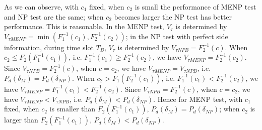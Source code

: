 As we can observe, with $c_1$  fixed, when $c_2$ is small the performance of MENP test and NP test are the same; when $c_2$ becomes larger the NP test has better performance. This is reasonable. In the MENP test, $V_\tau$ is determined by $V_{\tau MENP}= \min (F_1^{-1}(c_1), F_2^{-1}(c_2))$; in the NP test with perfect side information, during time slot $T_B$, $V_\tau$ is determined by $V_{\tau NP B} = F_2^{-1}(c)$. When $c_2 \leq F_2(F_1^{-1}(c_1))$, i.e. $F_1^{-1}(c_1) \geq  F_2^{-1}(c_2)$, we have  $V_{\tau MENP} = F_2^{-1}(c_2)$. Since $V_{\tau NP B} = F_2^{-1}(c)$, when $c = c_2$, we have $V_{\tau MENP} = V_{\tau NP B}$, i.e. $P_d(\delta_M) = P_d(\delta_{NP})$.    
When $c_2 > F_1(F_2^{-1}(c_1))$, i.e. $F_1^{-1}(c_1) < F_2^{-1}(c_2)$, we have  $V_{\tau MENP} = F_1^{-1}(c_1) < F_2^{-1}(c_2)$. Since $V_{\tau NP B} = F_2^{-1}(c)$, when $c = c_2$, we have  $V_{\tau MENP} < V_{\tau NP B}$, i.e.  $P_d(\delta_M) < P_d(\delta_{NP})$.
Hence for MENP test, with $c_1$ fixed, when $c_2$ is smaller than $ F_2( F_1^{-1}(c_1)) $, $P_d(\delta_M) = P_d(\delta_{NP})$; when $c_2$ is larger than $ F_2( F_1^{-1}(c_1)) $, $P_d(\delta_M) < P_d(\delta_{NP})$. 


